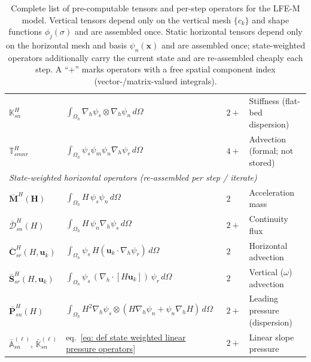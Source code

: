\documentclass{article}
\newcommand{\uk}{\mathbf{u}_k}
\newcommand{\nablah}{\nabla_h}
\newcommand{\HDdwsn}{\bar{\boldsymbol{\mathcal{D}}}_{sn}^H}
\newcommand{\HmMdwH}{\bar{\mathbf{M}}^H(\Hvec)}
\newcommand{\Hvec}{\mathbf{H}}
\begin{document}
\begin{table}[H]
\begin{tabular}{llll}
$\mathbb{K}^H_{sn}$ & $\int_{\Omega_h}\nablah\psi_s\otimes\nablah\psi_n\,d\Omega$ & $2{+}$ & Stiffness (flat-bed dispersion) \\
$\mathbb{T}^H_{smnr}$ & $\int_{\Omega_h}\psi_s\psi_m\psi_n\nablah\psi_r\,d\Omega$ & $4{+}$ & Advection (formal; not stored) \\
\midrule
\multicolumn{4}{l}{\textit{State-weighted horizontal operators (re-assembled per step / iterate)}}\\
$\HmMdwH$ & $\int_{\Omega_h}H\,\psi_s\psi_n\,d\Omega$ & $2$ & Acceleration mass \\
$\HDdwsn(H)$ & $\int_{\Omega_h}H\,\psi_n\nablah\psi_s\,d\Omega$ & $2{+}$ & Continuity flux \\
$\bar{\mathbf{C}}^H_{sr}(H,\uk)$ & $\int_{\Omega_h}\psi_s\,H(\uk\cdot\nablah\psi_r)\,d\Omega$ & $2$ & Horizontal advection \\
$\bar{\mathbf{S}}^H_{sr}(H,\uk)$ & $\int_{\Omega_h}\psi_s\,(\nablah\cdot[H\uk])\,\psi_r\,d\Omega$ & $2$ & Vertical ($\omega$) advection \\
$\bar{\mathbf{P}}^H_{sn}(H)$ & $\int_{\Omega_h}H^2\nablah\psi_s\otimes(H\nablah\psi_n+\psi_n\nablah H)\,d\Omega$ & $2{+}$ & Leading pressure (dispersion) \\
$\bar{\mathbb{A}}^{(\ell)}_{sn},\,\bar{\mathbb{K}}^{(\ell)}_{sn}$ & eq.~\eqref{eq: def state weighted linear pressure operators} & $2{+}$ & Linear slope pressure \\
\bottomrule
\end{tabular}
\caption{Complete list of pre-computable tensors and per-step operators for the LFE-M model. Vertical tensors depend only on the vertical mesh $\{c_k\}$ and shape functions $\phi_j(\sigma)$ and are assembled once. Static horizontal tensors depend only on the horizontal mesh and basis $\psi_n(\mathbf{x})$ and are assembled once; state-weighted operators additionally carry the current state and are re-assembled cheaply each step. A ``$+$'' marks operators with a free spatial component index (vector-/matrix-valued integrals).}
\label{tab: all tensors}
\end{table}
\end{document}
